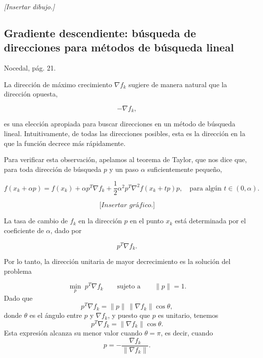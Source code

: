 \textit{[Insertar dibujo.]}

\subsection{Gradiente descendiente: búsqueda de direcciones para métodos de búsqueda lineal}

Nocedal, pág. 21.

La dirección de máximo crecimiento $\nabla f_k$ sugiere de manera natural que la dirección opuesta,

$$
-\nabla f_k,
$$

es una elección apropiada para buscar direcciones en un método de búsqueda lineal. Intuitivamente, de todas las direcciones posibles, esta es la dirección en la que la función decrece más rápidamente.

Para verificar esta observación, apelamos al teorema de Taylor, que nos dice que, para toda dirección de búsqueda $p$ y un paso $\alpha$ suficientemente pequeño,

$$
f(x_k + \alpha p) = f(x_k) + \alpha p^T \nabla f_k + \frac{1}{2}\alpha^2 p^T \nabla^2 f(x_k + t p) p, \quad \text{para algún } t \in (0, \alpha).
$$

$$\textit{[Insertar gráfico.]}$$

La tasa de cambio de $f_k$ en la dirección $p$ en el punto $x_k$ está determinada por el coeficiente de $\alpha$, dado por

$$
p^T\nabla f_k.
$$

Por lo tanto, la dirección unitaria de mayor decrecimiento es la solución del problema

$$
\min_p \; p^T\nabla f_k \qquad \text{sujeto a} \qquad \|p\|=1.
$$
Dado que
$$
p^T\nabla f_k
=
\|p\|\,\|\nabla f_k\|\cos\theta,
$$
donde $\theta$ es el ángulo entre $p$ y $\nabla f_k$, y puesto que $p$ es unitario, tenemos
$$
p^T\nabla f_k
=
\|\nabla f_k\|\cos\theta.
$$
Esta expresión alcanza su menor valor cuando $\theta=\pi$, es decir, cuando
$$
p=-\frac{\nabla f_k}{\|\nabla f_k\|}.
$$

